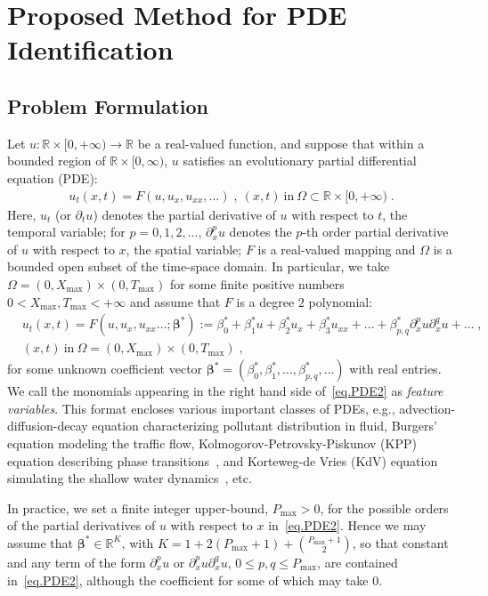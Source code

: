 \documentclass[a4paper,11pt]{article}
\newcommand{\bbeta}{\bm{\beta}}
\begin{document}
\section{Proposed Method for PDE Identification}
\subsection{Problem Formulation}
Let $u:\mathbb{R}\times[0,+\infty)\to\mathbb{R}$ be a real-valued function, and suppose that within a bounded region of $\mathbb{R}\times[0,\infty)$, $u$ satisfies an evolutionary partial differential equation (PDE):
\begin{align}
u_t(x,t) = F(u,u_x,u_{xx},\dots)	\;,~(x,t)~\text{in}~\Omega\subset\mathbb{R}\times[0,+\infty)\;.\label{eq.PDE}
\end{align}
Here, $u_t$ (or $\partial_tu$) denotes the partial derivative of $u$ with respect to $t$, the temporal variable; for $p=0,1,2,\dots$, $\partial^{p}_xu$ denotes the $p$-th order partial derivative of $u$ with respect to $x$, the spatial variable; $F$ is a real-valued mapping and $\Omega$ is a bounded open subset of the time-space domain. In particular, we take $\Omega=(0,X_{\max})\times(0,T_{\max})$ for some finite positive numbers $0<X_{\max}, T_{\max}<+\infty$ and assume that $F$ is a degree $2$ polynomial:
\begin{align}
&u_t(x,t) = F(u,u_x,u_{xx}\dots;\bbeta^*):=\beta^*_0+\beta^*_1u+\beta^*_2u_x+\beta^*_3u_{xx}+\dots+\beta^*_{p,q}\partial^p_xu\partial^q_xu+\dots	\;,\nonumber\\
&(x,t)~\text{in}~\Omega = (0,X_{\max})\times(0,T_{\max})\;,\label{eq.PDE2}
\end{align}
for some  unknown coefficient vector $\bbeta^*=(\beta^*_0,\beta^*_1,\dots,\beta^*_{p,q},\dots)$ with real entries. We call the monomials appearing in the right hand side of~\eqref{eq.PDE2} as \textit{feature variables}. This format encloses various important classes of PDEs, e.g., advection-diffusion-decay equation characterizing pollutant distribution in fluid, Burgers' equation modeling the traffic flow, Kolmogorov-Petrovsky-Piskunov (KPP) equation describing phase transitions~\cite{tikhomirov1991study}, and Korteweg-de Vries (KdV) equation simulating the shallow water dynamics~\cite{newell1985solitons}, etc.

In practice, we set a finite integer upper-bound, $P_{\max}>0$, for the possible orders of the partial derivatives of $u$ with respect to $x$ in~\eqref{eq.PDE2}. Hence we may assume that $\bbeta^*\in\mathbb{R}^{K}$, with $K=1+2(P_{\max}+1)+{{P_{\max}+1}\choose{2}}$, so that constant and any term of the form $\partial_x^pu$ or $\partial^p_xu\partial_x^qu$, $0\leq p,q\leq P_{\max}$, are contained  in~\eqref{eq.PDE2}, although the coefficient for some of which may take $0$.
\end{document}
